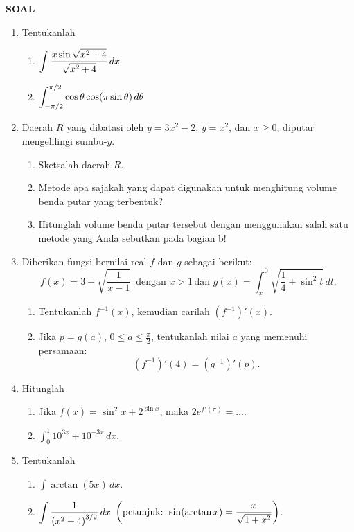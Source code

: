 \begin{center}
\textbf{\large{SOAL}}
\end{center}
\begin{enumerate}[leftmargin=*, label={\arabic*}.]
\item Tentukanlah
    \begin{enumerate}[label={\alph*}.]
    \item $\ds\int \frac{x\sin\sqrt{x^{2}+4}}{\sqrt{x^{2}+4}}\, dx$
    \item $\ds\int_{-\pi/2}^{\pi/2} \cos\theta\cos\brk*{\pi\sin\theta}\,d\theta$
    \end{enumerate}
\item Daerah $R$ yang dibatasi oleh $y=3x^{2}-2$, $y=x^{2}$, dan $x\geq 0$, diputar 
mengelilingi sumbu-$y$.
    \begin{enumerate}[label={\alph*}.]
    \item Sketsalah daerah $R$.
    \item Metode apa sajakah yang dapat digunakan untuk menghitung volume benda putar 
    yang terbentuk?
    \item Hitunglah volume benda putar tersebut dengan menggunakan salah satu metode yang 
    Anda sebutkan pada bagian b!
    \end{enumerate}
\item Diberikan fungsi bernilai real $f$ dan $g$ sebagai berikut:
\[
f(x)=3+\sqrt{\frac{1}{x-1}}\,\text{ dengan }x > 1\,\text{dan }g(x)=
\int_{x}^{0}\sqrt{\frac{1}{4}+\sin^{2}t}\,dt.
\]
    \begin{enumerate}[label={\alph*}.]
    \item Tentukanlah $f^{-1}(x)$, kemudian carilah $(f^{-1})'(x)$.
    \item Jika $p=g(a)$, $0\leq a \leq \frac{\pi}{2}$, tentukanlah nilai $a$ 
    yang memenuhi persamaan:
    \[
    (f^{-1})'(4)=(g^{-1})'(p).
    \]
    \end{enumerate}
\item Hitunglah
    \begin{enumerate}[label={\alph*}.]
    \item Jika $f(x)=\sin^{2}x+2^{\sin x}$, maka $2e^{f'(\pi)}=\dots$.
    \item $\int_{0}^{1} 10^{3x}+10^{-3x}\,dx$.
    \end{enumerate}
\item Tentukanlah
    \begin{enumerate}[label={\alph*}.]
    \item $\int \arctan(5x)\,dx$.
    \item $\ds \int \frac{1}{\brk*{x^{2}+4}^{3/2}}\,dx$ 
    $\ds\brk*{\text{petunjuk: } \sin(\arctan x) = \frac{x}{\sqrt{1+x^{2}}}}$.
    \end{enumerate}
\end{enumerate}


